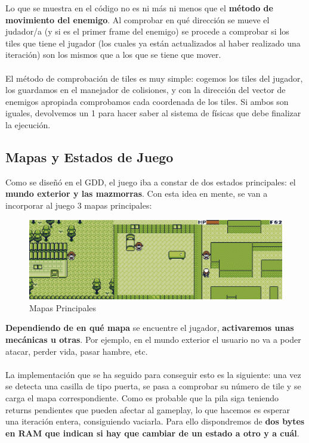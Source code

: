 Lo que se muestra en el código no es ni más ni menos que el \textbf{método de movimiento del enemigo}. Al comprobar en qué dirección se mueve el judador/a (y si es el primer frame del enemigo) se procede a comprobar si los tiles que tiene el jugador (los cuales ya están actualizados al haber realizado una iteración) son los mismos que a los que se tiene que mover.
\\ \\
El método de comprobación de tiles es muy simple: cogemos los tiles del jugador, los guardamos en el manejador de colisiones, y con la dirección del vector de enemigos apropiada comprobamos cada coordenada de los tiles. Si ambos son iguales, devolvemos un 1 para hacer saber al sistema de físicas que debe finalizar la ejecución.

\clearpage

\subsection{Mapas y Estados de Juego}

Como se diseñó en el GDD, el juego iba a constar de dos estados principales: el \textbf{mundo exterior y las mazmorras}. Con esta idea en mente, se van a incorporar al juego 3 mapas principales:

\begin{figure}[h]
\centering
\includegraphics[width=1\textwidth]{include/images/desarrollo/states.png}
\caption{Mapas Principales}
\label{figure:states}
\end{figure}

\textbf{Dependiendo de en qué mapa} se encuentre el jugador, \textbf{activaremos unas mecánicas u otras}. Por ejemplo, en el mundo exterior el usuario no va a poder atacar, perder vida, pasar hambre, etc.
\\ \\
La implementación que se ha seguido para conseguir esto es la siguiente: una vez se detecta una casilla de tipo puerta, se pasa a comprobar su número de tile y se carga el mapa correspondiente. Como es probable que la pila siga teniendo returns pendientes que pueden afectar al gameplay, lo que hacemos es esperar una iteración entera, consiguiendo vaciarla. Para ello dispondremos de \textbf{dos bytes en RAM que indican si hay que cambiar de un estado a otro y a cuál}.

